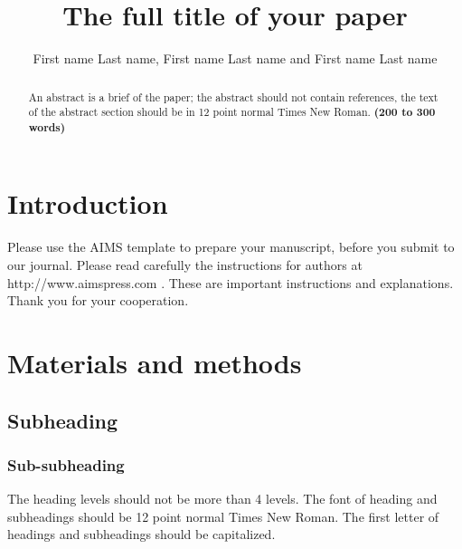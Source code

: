 \documentclass{aims}
\numberwithin{equation}{section}
\begin{document}
\title{The full title of your paper}

\author{%
  First name Last name,
  First name Last name
  and
  First name Last name\corrauth
}


\address{%
  }


\begin{abstract}
An abstract is a brief of the paper; the abstract should not 
contain references, the text of the abstract section should be
in 12 point normal Times New Roman.
\textbf{(200 to 300 words)}
\end{abstract}


\maketitle

\section{Introduction}

Please use the AIMS template to prepare your manuscript, 
before you submit to our journal. 
Please read carefully the instructions for authors at
http://www.aimspress.com \cite{A11}. 
These are important instructions and explanations. 
Thank you for your cooperation.


\section{Materials and methods}
\subsection{Subheading}

\subsubsection{Sub-subheading}
The heading levels should not be more than 4 levels. 
The font of heading and subheadings should be 12 point 
normal Times New Roman. The first letter of headings 
and subheadings should be capitalized.
\end{document}
